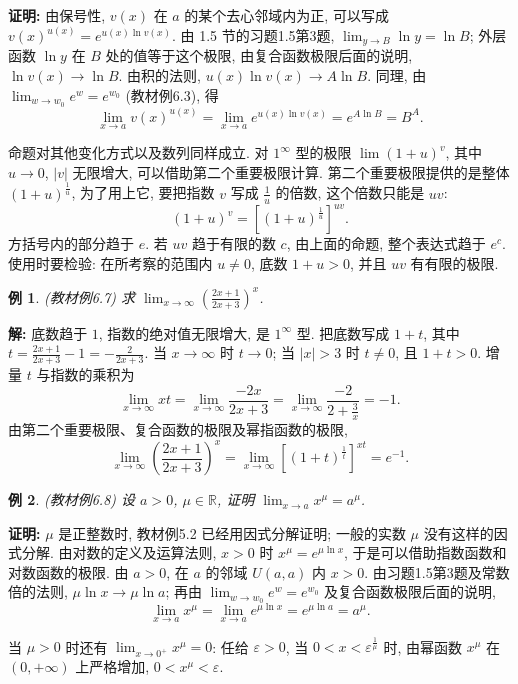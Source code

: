 \documentclass[UTF8,openany]{ctexbook}
\theoremstyle{chinesetextbook}
\newtheorem{example}{例}[section]
\newenvironment{cnproof}{\par\indent\textbf{证明:} \ignorespaces}{\par}
\newenvironment{cnsolution}{\par\indent\textbf{解:} \ignorespaces}{\par}
\begin{document}
\begin{cnproof}
由保号性, $v(x)$ 在 $a$ 的某个去心邻域内为正, 可以写成 $v(x)^{u(x)}=e^{u(x)\ln v(x)}$. 由 1.5 节的习题1.5第3题, $\displaystyle\lim_{y\to B}\ln y=\ln B$; 外层函数 $\ln y$ 在 $B$ 处的值等于这个极限, 由复合函数极限后面的说明, $\ln v(x)\to\ln B$. 由积的法则, $u(x)\ln v(x)\to A\ln B$. 同理, 由 $\displaystyle\lim_{w\to w_0}e^w=e^{w_0}$ (教材例6.3), 得
\[
\lim_{x\to a}v(x)^{u(x)}=\lim_{x\to a}e^{u(x)\ln v(x)}=e^{A\ln B}=B^A.
\]
\end{cnproof}
命题对其他变化方式以及数列同样成立. 对 $1^\infty$ 型的极限 $\displaystyle\lim(1+u)^v$, 其中 $u\to0$, $|v|$ 无限增大, 可以借助第二个重要极限计算. 第二个重要极限提供的是整体 $(1+u)^{\frac1u}$, 为了用上它, 要把指数 $v$ 写成 $\displaystyle\frac1u$ 的倍数, 这个倍数只能是 $uv$:
\[
(1+u)^v=\left[(1+u)^{\frac1u}\right]^{uv}.
\]
方括号内的部分趋于 $e$. 若 $uv$ 趋于有限的数 $c$, 由上面的命题, 整个表达式趋于 $e^c$. 使用时要检验: 在所考察的范围内 $u\ne0$, 底数 $1+u>0$, 并且 $uv$ 有有限的极限.
\begin{example}
\textnormal{(教材例6.7)} 求 $\displaystyle\lim_{x\to\infty}\left(\frac{2x+1}{2x+3}\right)^x$.
\end{example}
\begin{cnsolution}
底数趋于 $1$, 指数的绝对值无限增大, 是 $1^\infty$ 型. 把底数写成 $1+t$, 其中 $\displaystyle t=\frac{2x+1}{2x+3}-1=-\frac2{2x+3}$. 当 $x\to\infty$ 时 $t\to0$; 当 $|x|>3$ 时 $t\ne0$, 且 $1+t>0$. 增量 $t$ 与指数的乘积为
\[
\lim_{x\to\infty}xt=\lim_{x\to\infty}\frac{-2x}{2x+3}=\lim_{x\to\infty}\frac{-2}{2+\frac3x}=-1.
\]
由第二个重要极限、复合函数的极限及幂指函数的极限,
\[
\lim_{x\to\infty}\left(\frac{2x+1}{2x+3}\right)^x=\lim_{x\to\infty}\left[(1+t)^{\frac1t}\right]^{xt}=e^{-1}.
\]
\end{cnsolution}
\begin{example}
\textnormal{(教材例6.8)} 设 $a>0$, $\mu\in\mathbb R$, 证明 $\displaystyle\lim_{x\to a}x^\mu=a^\mu$.
\end{example}
\begin{cnproof}
$\mu$ 是正整数时, 教材例5.2 已经用因式分解证明; 一般的实数 $\mu$ 没有这样的因式分解. 由对数的定义及运算法则, $x>0$ 时 $x^\mu=e^{\mu\ln x}$, 于是可以借助指数函数和对数函数的极限. 由 $a>0$, 在 $a$ 的邻域 $U(a,a)$ 内 $x>0$. 由习题1.5第3题及常数倍的法则, $\mu\ln x\to\mu\ln a$; 再由 $\displaystyle\lim_{w\to w_0}e^w=e^{w_0}$ 及复合函数极限后面的说明,
\[
\lim_{x\to a}x^\mu=\lim_{x\to a}e^{\mu\ln x}=e^{\mu\ln a}=a^\mu.
\]
\end{cnproof}
当 $\mu>0$ 时还有 $\displaystyle\lim_{x\to0^+}x^\mu=0$: 任给 $\varepsilon>0$, 当 $0<x<\varepsilon^{\frac1\mu}$ 时, 由幂函数 $x^\mu$ 在 $(0,+\infty)$ 上严格增加, $0<x^\mu<\varepsilon$.
\end{document}
